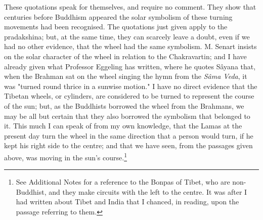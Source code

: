 \documentclass[a4paper, 11pt, oneside, polutonikogreek, english]{article}
\begin{document}
These quotations speak for themselves, and require no comment. They show that centuries before Buddhism appeared the solar symbolism of these turning movements had been recognised. The quotations just given apply to the pradakshina; but, at the same time, they can scarcely leave a doubt, even if we had no other evidence, that the wheel had the same symbolism. M. Senart insists on the solar character of the wheel in relation to the Chakravartin; and I have already given what Professor Eggeling has written, where he quotes Sâyana that, when the Brahman sat on the wheel singing the hymn from the \emph{Sâma Veda}, it was "turned round thrice in a sunwise motion." I have no direct evidence that the Tibetan wheels, or cylinders, are considered to be turned to represent the course of the sun; but, as the Buddhists borrowed the wheel from the Brahmans, we may be all but certain that they also borrowed the symbolism that belonged to it. This much I can speak of from my own knowledge, that the Lamas at the present day turn the wheel in the same direction that a person would turn, if he kept his right side to the centre; and that we have seen, from the passages given above, was moving in the sun's course.\footnote{See Additional Notes for a reference to the Bonpas of Tibet, who are non-Buddhist, and they make circuits with the left to the centre. It was after I had written about Tibet and India that I chanced, in reading, upon the passage referring to them.}
\end{document}
